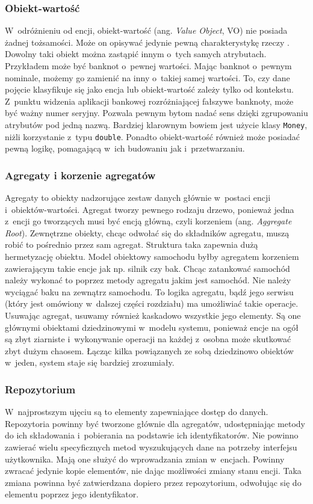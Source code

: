 \documentclass[a4paper]{book}
\newcommand{\obcy}[2]{{\selectlanguage{#1}#2}}
\newcommand{\ang}[1]{\emph{\obcy{british}{#1}}}
\begin{document}
{\subsubsection{Obiekt-wartość}
W~odróżnieniu od encji, obiekt-wartość (ang. \ang{Value Object}, VO) nie posiada żadnej tożsamości. Może on opisywać jedynie pewną charakterystykę rzeczy \cite{id:DDD_Evans}. Dowolny taki obiekt można zastąpić innym o~tych samych atrybutach. Przykładem może być banknot o~pewnej wartości. Mając banknot o~pewnym nominale, możemy go zamienić na inny o~takiej samej wartości. To, czy dane pojęcie klasyfikuje się jako encja lub obiekt-wartość zależy tylko od kontekstu. Z~punktu widzenia aplikacji bankowej rozróżniającej fałszywe banknoty, może być ważny numer seryjny. Pozwala pewnym bytom nadać sens dzięki zgrupowaniu atrybutów pod jedną nazwą. Bardziej klarownym bowiem jest użycie klasy \lstinline|Money|, niżli korzystanie z~typu \lstinline|double|. Ponadto obiekt-wartość również może posiadać pewną logikę, pomagającą w~ich budowaniu jak i~przetwarzaniu.

\subsubsection{Agregaty i korzenie agregatów}
Agregaty to obiekty nadzorujące zestaw danych głównie w~postaci encji i~obiektów-wartości. Agregat tworzy pewnego rodzaju drzewo, ponieważ jedna z~encji go tworzących musi być encją główną, czyli korzeniem (ang. \ang{Aggregate Root}). Zewnętrzne obiekty, chcąc odwołać się do składników agregatu, muszą robić to pośrednio przez sam agregat. Struktura taka zapewnia dużą hermetyzację obiektu. Model obiektowy samochodu byłby agregatem korzeniem zawierającym takie encje jak np. silnik czy bak. Chcąc zatankować samochód należy wykonać to poprzez metody agregatu jakim jest samochód. Nie należy wyciągać baku na zewnątrz samochodu. To logika agregatu, bądź jego serwisu (który jest omówiony w~dalszej części rozdziału) ma umożliwiać takie operacje. Usuwając agregat, usuwamy również kaskadowo wszystkie jego elementy. Są one głównymi obiektami dziedzinowymi w~modelu systemu, ponieważ encje na ogół są zbyt ziarniste i~wykonywanie operacji na każdej z~osobna może skutkować zbyt dużym chaosem. Łącząc kilka powiązanych ze sobą dziedzinowo obiektów w~jeden, system staje się bardziej zrozumiały. 

\subsubsection{Repozytorium}
W~najprostszym ujęciu są to elementy zapewniające dostęp do danych. Repozytoria powinny być tworzone głównie dla agregatów, udostępniając metody do ich składowania i~pobierania na podstawie ich identyfikatorów. Nie powinno zawierać wielu specyficznych metod wyszukujących dane na potrzeby interfejsu użytkownika. Mają one służyć do wprowadzania zmian w~encjach. Powinny zwracać jedynie kopie elementów, nie dając możliwości zmiany stanu encji. Taka zmiana powinna być zatwierdzana dopiero przez repozytorium, odwołując się do elementu poprzez jego identyfikator.

}
\end{document}
